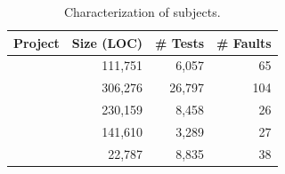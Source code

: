 \documentclass{article}
\begin{document}
\begin{table}[h]
  \small
  \centering
  \setlength{\tabcolsep}{4pt}
  \begin{tabular}{lrrr}
    \toprule
    Project            & Size (LOC) & \# Tests & \# Faults \\ %
    \midrule
    \lang{}            & 111,751  & 6,057 & 65       \\   %
    \cmath{}           & 306,276  & 26,797 & 104     \\   %
    \chart{}           & 230,159  & 8,458 & 26      \\  %
    \jtime{}           & 141,610  & 3,289 & 27       \\   %
    \mockito{}         & 22,787  & 8,835 & 38    \\     %
    \bottomrule
  \end{tabular}
  \caption {Characterization of \dfj{} subjects.}
  \label{tab:df4j}
\end{table}
\normalsize




\end{document}

